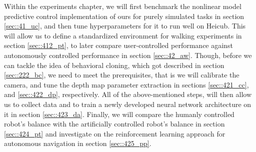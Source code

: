 \label{sec::4_ex}
Within the experiments chapter, we will first benchmark the nonlinear model predictive control implementation of ours for purely simulated tasks in section \ref{sec::41_uc}, and then tune hyperparameters for it to run well on Heicub. This will allow us to define a standardized environment for walking experiments in section \ref{sec::412_pt}, to later compare user-controlled performance against autonomously controlled performance in section \ref{sec::42_aw}. Though, before we can tackle the idea of behavioral cloning, which got described in section \ref{sec::222_bc}, we need to meet the prerequisites, that is we will calibrate the camera, and tune the depth map parameter extraction in sections \ref{sec::421_cc}, and \ref{sec::422_dp}, respectively. All of the above-mentioned steps, will then allow us to collect data and to train a newly developed neural network architecture on it in section \ref{sec::423_da}. Finally, we will compare the humanly controlled robot's balance with the artificially controlled robot's balance in section \ref{sec::424_pt} and investigate on the reinforcement learning approach for autonomous navigation in section \ref{sec::425_pp}.